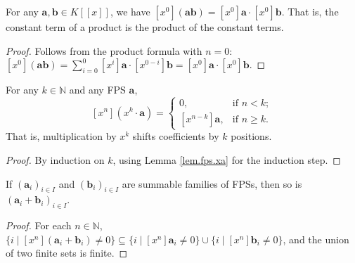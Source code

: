 \begin{lemma}
\label{lem.fps.coeff.zero.mul}
\leanhelper
\leanok
For any $\mathbf{a},\mathbf{b}\in K\left[\left[x\right]\right]$, we have
$\left[x^{0}\right]\left(\mathbf{ab}\right) = \left[x^{0}\right]
\mathbf{a}\cdot\left[x^{0}\right]\mathbf{b}$.
That is, the constant term of a product is the product of the constant terms.
\end{lemma}

\begin{proof}
\leanok
Follows from the product formula with $n=0$: $\left[x^{0}\right](\mathbf{ab}) = \sum_{i=0}^{0} \left[x^{i}\right]\mathbf{a}\cdot\left[x^{0-i}\right]\mathbf{b} = \left[x^{0}\right]\mathbf{a}\cdot\left[x^{0}\right]\mathbf{b}$.
\end{proof}

\begin{lemma}
\label{lem.fps.xk.mul.shift}
\leanhelper
\leanok
For any $k\in\mathbb{N}$ and any FPS $\mathbf{a}$,
\[
\left[x^{n}\right]\left(x^{k}\cdot\mathbf{a}\right) =
\begin{cases}
0, & \text{if }n<k;\\
\left[x^{n-k}\right]\mathbf{a}, & \text{if }n\geq k.
\end{cases}
\]
That is, multiplication by $x^{k}$ shifts coefficients by $k$ positions.
\end{lemma}

\begin{proof}
\leanok
By induction on $k$, using Lemma \ref{lem.fps.xa} for the induction step.
\end{proof}

\begin{lemma}
\label{lem.fps.summable.add}
\leanhelper
\leanok
If $\left(\mathbf{a}_{i}\right)_{i\in I}$ and $\left(\mathbf{b}_{i}\right)_{i\in I}$
are summable families of FPSs, then so is $\left(\mathbf{a}_{i}+\mathbf{b}_{i}\right)_{i\in I}$.
\end{lemma}

\begin{proof}
\leanok
For each $n\in\mathbb{N}$,
$\{i \mid \left[x^{n}\right](\mathbf{a}_{i}+\mathbf{b}_{i})\neq 0\}
\subseteq \{i \mid \left[x^{n}\right]\mathbf{a}_{i}\neq 0\} \cup
\{i \mid \left[x^{n}\right]\mathbf{b}_{i}\neq 0\}$, and the union of two
finite sets is finite.
\end{proof}

